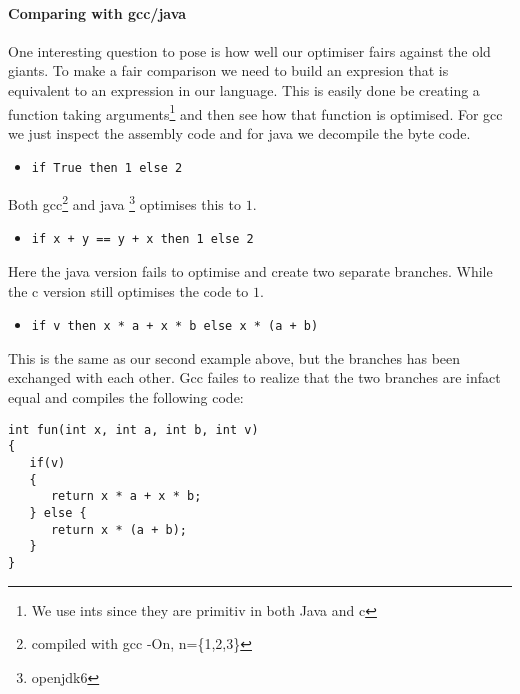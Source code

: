 \paragraph{Comparing with gcc/java}
One interesting question to pose is how well our optimiser fairs against the old giants.
To make a fair comparison we need to build an expresion that is equivalent to an expression in our language. This is easily done be creating a function taking arguments\footnote{We use ints since they are primitiv in both Java and c} and then see how that function is optimised. For gcc we just inspect the assembly code and for java we decompile the byte code.
\begin{itemize}
  \item \verb|if True then 1 else 2|
\end{itemize}
Both gcc\footnote{compiled with gcc -On, n=\{1,2,3\}} and java \footnote{openjdk6} optimises this to $1$.

\begin{itemize}
  \item \verb|if x + y == y + x then 1 else 2|
\end{itemize}
Here the java version fails to optimise and create two separate branches. While the c version still optimises the code to $1$.
\begin{itemize}
  \item \verb|if v then x * a + x * b else x * (a + b)|
\end{itemize}
This is the same as our second example above, but the branches has been exchanged with each other.
Gcc failes to realize that the two branches are infact equal and compiles the following code: 
\begin{verbatim}
int fun(int x, int a, int b, int v)                                                         {                                                                                    
   if(v)
   {                                                                     
      return x * a + x * b;                                                        
   } else {                                                                         
      return x * (a + b);                                                          
   }
}
\end{verbatim}

